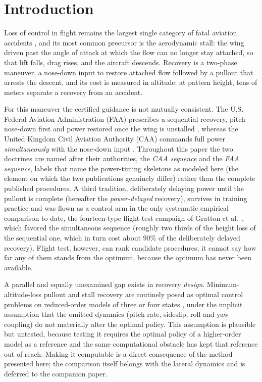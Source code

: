 \documentclass[journal ]{new-aiaa}
\begin{document}
\addtocounter{table}{-1}

\newpage
\section{Introduction}
Loss of control in flight remains the largest single category of
fatal aviation accidents \cite{Belcastro2010}, and its most common
precursor is the aerodynamic stall: the wing driven past the angle of
attack at which the flow can no longer stay attached, so that lift
falls, drag rises, and the aircraft descends. Recovery is a two-phase
maneuver, a nose-down input to restore attached flow followed by a
pullout that arrests the descent, and its cost is measured in
altitude: at pattern height, tens of meters separate a recovery from
an accident.

For this maneuver the certified guidance is not mutually consistent.
The U.S. Federal Aviation Administration (FAA) prescribes a
sequential recovery, pitch nose-down first and power restored once
the wing is unstalled \cite{FAA2021}, whereas the United Kingdom
Civil Aviation Authority (CAA) commands full power
\emph{simultaneously} with the nose-down input \cite{CAA2009}.
Throughout this paper the two doctrines are named after their
authorities, the \emph{CAA sequence} and the \emph{FAA sequence},
labels that name the power-timing skeletons as modeled here (the
element on which the two publications genuinely differ) rather than
the complete published procedures. A third tradition, deliberately
delaying power until the pullout is complete (hereafter the
\emph{power-delayed} recovery), survives in training
practice and was flown as a control arm in the only systematic
empirical comparison to date, the fourteen-type flight-test campaign
of Gratton et al.\ \cite{Gratton2014}, which favored the simultaneous
sequence (roughly two thirds of the height loss of the sequential
one, which in turn cost about $90\%$ of the deliberately delayed
recovery). Flight test, however, can rank candidate procedures; it cannot
say how far any of them stands from the optimum, because the optimum
has never been available.

A parallel and equally unexamined gap exists in recovery \emph{design}.
Minimum-altitude-loss pullout and stall recovery are routinely posed as
optimal control problems on reduced-order models of three or four states
\cite{Bunge2018}, under the implicit assumption that the omitted
dynamics (pitch rate, sideslip, roll and yaw coupling) do not
materially alter the optimal policy. This assumption is plausible but
untested, because testing it requires the optimal policy of a
higher-order model as a reference and the same computational obstacle
has kept that reference out of reach. Making it computable is a direct
consequence of the method presented here; the comparison itself belongs
with the lateral dynamics and is deferred to the companion paper.
\end{document}
